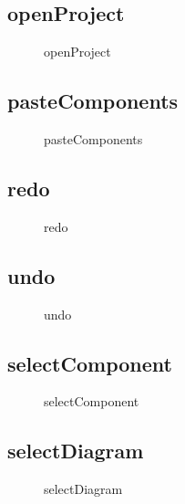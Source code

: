 \documentclass[12pt]{article}
\begin{document}
\subsection{openProject}
\begin{figure}[H]
  \centering
    
  \caption{openProject}
\end{figure}


\subsection{pasteComponents}
\begin{figure}[H]
  \centering
    
  \caption{pasteComponents}
\end{figure}


\subsection{redo}
\begin{figure}[H]
  \centering
    
  \caption{redo}
\end{figure}

\subsection{undo}
\begin{figure}[H]
  \centering
    
  \caption{undo}
\end{figure}

\subsection{selectComponent}
\begin{figure}[H]
  \centering
    
  \caption{selectComponent}
\end{figure}

\subsection{selectDiagram}
\begin{figure}[H]
  \centering
    
  \caption{selectDiagram}
\end{figure}
\end{document}
